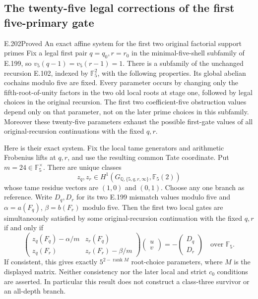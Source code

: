 \subsection{The twenty-five legal corrections of the first five-primary gate}

\begin{result}{E.202}{Proved}
{An exact affine system for the first two original factorial support primes}
Fix a legal first pair $q=q_0,r=r_0$ in the minimal-five-shell
subfamily of E.199, so $v_5(q-1)=v_5(r-1)=1$.
There is a subfamily of the unchanged recursion E.102, indexed by
$\mathbb F_5^2$, with the following properties.  Its global abelian
cochains modulo five are fixed.  Every parameter occurs by changing
only the fifth-root-of-unity factors in the two old local roots at
stage one, followed by legal choices in the original recursion.
The first two coefficient-five obstruction values depend only on
that parameter, not on the later prime choices in this subfamily.
Moreover these twenty-five parameters exhaust the possible first-gate
values of all original-recursion continuations with the fixed $q,r$.

Here is their exact system.  Fix the local tame generators and
arithmetic Frobenius lifts at $q,r$, and use the resulting common
Tate coordinate.  Put $m=24\in\mathbb F_5^\times$.
There are unique classes
\[
 z_q,z_r\in H^1(G_{\mathbb Q,\{5,q,r,\infty\}},\mathbb F_5(2))
\]
whose tame residue vectors are $(1,0)$ and $(0,1)$.
Choose any one branch as reference.  Write $D_q,D_r$ for its two
E.199 mismatch values modulo five and $\alpha=a(F_q)$,
$\beta=b(F_r)$ modulo five.  Then the first two local gates are
simultaneously satisfied by some original-recursion continuation
with the fixed $q,r$ if and only if
\[
 \begin{pmatrix}
 z_q(F_q)-\alpha/m&z_r(F_q)\\
 z_q(F_r)&z_r(F_r)-\beta/m
 \end{pmatrix}
 \begin{pmatrix}u\\v\end{pmatrix}
 =-\begin{pmatrix}D_q\\D_r\end{pmatrix}
 \quad\text{over }\mathbb F_5.
 \tag{E.202.1}
\]
If consistent, this gives exactly $5^{2-\operatorname{rank}M}$
root-choice parameters, where $M$ is the displayed matrix.
Neither consistency nor the later local and strict $c_0$ conditions
are asserted.  In particular this result does not construct a
class-three survivor or an all-depth branch.
\end{result}

